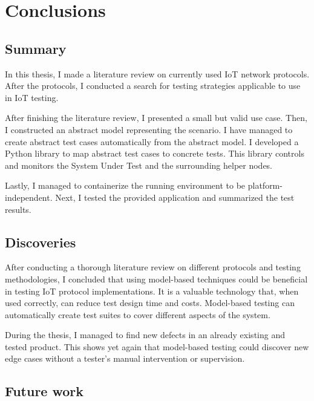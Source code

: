 \chapter{Conclusions}
\label{chap:conclusion}
\section{Summary}
\label{sec:conc:summ}
In this thesis, I made a literature review on currently used IoT network protocols. After the protocols, I conducted a search for testing strategies applicable to use in IoT testing. 

After finishing the literature review, I presented a small but valid use case. Then, I constructed an abstract model representing the scenario. I have managed to create abstract test cases automatically from the abstract model. I developed a Python library to map abstract test cases to concrete tests. This library controls and monitors the System Under Test and the surrounding helper nodes.

Lastly, I managed to containerize the running environment to be platform-independent. Next, I tested the provided application and summarized the test results.

\section{Discoveries}
\label{sec:conc:disc}
After conducting a thorough literature review on different protocols and testing methodologies, I concluded that using model-based techniques could be beneficial in testing IoT protocol implementations. It is a valuable technology that, when used correctly, can reduce test design time and costs. Model-based testing can automatically create test suites to cover different aspects of the system. 

During the thesis, I managed to find new defects in an already existing and tested product. This shows yet again that model-based testing could discover new edge cases without a tester's manual intervention or supervision.
\section{Future work}
\label{sec:conc:future}
